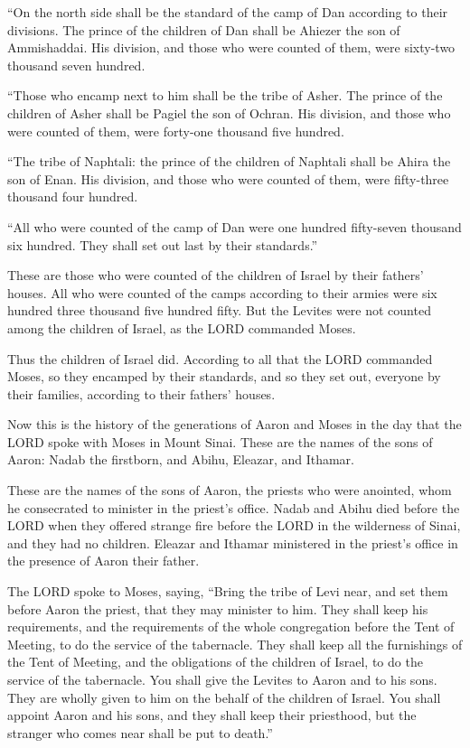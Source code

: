 \myverse{}“On the north side shall be the standard of the camp of Dan according
to their divisions. The prince of the children of Dan shall be Ahiezer the son of Ammishaddai.
\myverse{}His division, and those who were counted of them, were sixty-two thousand
seven hundred.


\myverse{}“Those who encamp next to him shall be the tribe of Asher. The
prince of the children of Asher shall be Pagiel the son of Ochran.
\myverse{}His division, and those who were counted of them, were forty-one thousand
five hundred.


\myverse{}“The tribe of Naphtali: the prince of the children of Naphtali
shall be Ahira the son of Enan.
\myverse{}His division, and those who were counted of them, were fifty-three thousand
four hundred.


\myverse{}“All who were counted of the camp of Dan were one hundred fifty-seven
thousand six hundred. They shall set out last by their standards.”


\myverse{}These are those who were counted of the children of Israel by
their fathers’ houses. All who were counted of the camps according to their armies were six hundred three
thousand five hundred fifty.
\myverse{}But the Levites were not counted among the children of Israel, as the LORD
commanded Moses.


\myverse{}Thus the children of Israel did. According to all that the LORD
commanded Moses, so they encamped by their standards, and so they set out, everyone by their families,
according to their fathers’ houses.


\mychapter{} \myverse*{}Now this is the history of the generations of Aaron and Moses in
the day that the LORD spoke with Moses in Mount Sinai.
\myverse{}These are the names of the sons of Aaron: Nadab the firstborn, and Abihu, Eleazar,
and Ithamar.


\myverse{}These are the names of the sons of Aaron, the priests who were
anointed, whom he consecrated to minister in the priest’s office.
\myverse{}Nadab and Abihu died before the LORD when they offered strange fire before the
LORD in the wilderness of Sinai, and they had no children. Eleazar and Ithamar ministered in the priest’s
office in the presence of Aaron their father.


\myverse{}The LORD spoke to Moses, saying,
\myverse{}“Bring the tribe of Levi near, and set them before Aaron the priest, that they
may minister to him.
\myverse{}They shall keep his requirements, and the requirements of the whole congregation
before the Tent of Meeting, to do the service of the tabernacle.
\myverse{}They shall keep all the furnishings of the Tent of Meeting, and the obligations
of the children of Israel, to do the service of the tabernacle.
\myverse{}You shall give the Levites to Aaron and to his sons. They are wholly given to
him on the behalf of the children of Israel.
\myverse{}You shall appoint Aaron and his sons, and they shall keep their priesthood,
but the stranger who comes near shall be put to death.”


